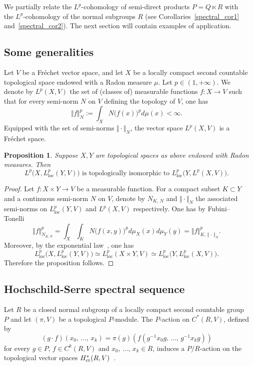 \documentclass[11pt]{article}
\newtheorem{prop}[theo]{Proposition}
\theoremstyle{definition}
\numberwithin{equation}{section}
\numberwithin{figure}{section}
\numberwithin{table}{section}
\DeclareMathOperator{\ct}{ct}
\DeclareMathOperator{\loc}{loc}
\begin{document}
We partially relate the $L^p$-cohomology of semi-direct products $P = Q \ltimes R$ with the $L^p$-cohomology of the normal subgroups $R$ (see Corollaries~\ref{spectral_cor1} and~\ref{spectral_cor2}). The next section will contain examples of application.

\subsection*{Some generalities}

Let $V$ be a Fréchet vector space, and let $X$ be a locally compact second countable topological space endowed with a Radon measure $\mu$. Let $p \in (1, +\infty)$. We denote by $L^p(X, V)$ the set of (classes of) measurable functions $f: X \to V$ such that for every semi-norm $N$ on $V$ defining the topology of $V$, one has
\[
\Vert f \Vert _N ^p:= \int _X N\bigl(f(x)\bigr) ^p d\mu (x) < \infty.
\]
Equipped with the set of semi-norms $\Vert \cdot \Vert _N$, the vector space $L^p(X,V)$ is a Fréchet space.



\begin{prop}\label{generalities_prop2}
Suppose $X, Y$ are topological spaces as above endowed with Radon measures. Then
\[
L^p\bigl(X, L_{\loc}^p (Y, V)\bigr) \text{ is topologically isomorphic to }L_{\loc}^p \bigl(Y, L^p (X,V)\bigr).
\]
\end{prop}

\begin{proof}
Let $f: X \times Y \to V$ be a measurable function.
For a compact subset $K \subset Y$ and a continuous semi-norm $N$ on $V$, denote by $N_{K,\,N}$ and $\Vert \cdot \Vert _N$ the associated semi-norms on $L_{\loc}^p (Y, V)$ and $L^p (X,V)$ respectively. One has by Fubini--Tonelli
\[
\Vert f \Vert _{N_{K, N}} ^p
= \int _X \int _K N\bigl(f(x,y)\bigr) ^p d\mu_X (x) d\mu _Y (y)= \Vert f \Vert _{K,\, \Vert\,\cdot\,\Vert _N} ^p.
\]
Moreover, by the exponential law~\cite[Lemma~1.4]{Bl}, one has
\[
L_{\loc} ^p \bigl(X, L_{\loc} ^p(Y, V)\bigr) \simeq L_{\loc} ^p (X \times Y, V) \simeq
L_{\loc} ^p \bigl(Y, L_{\loc} ^p(X, V)\bigr).
\]
Therefore the proposition follows.
\end{proof}


\subsection*{Hochschild-Serre spectral sequence}

Let $R$ be a closed normal subgroup of a locally compact second countable group $P$ and let $(\pi, V)$ be a topological $P$-module. The $P$-action on $C^*(R,V)$, defined by
\[
(g \cdot f) (x_0,\,\dots,\,x_k) = \pi (g)\left(f\left(g^{-1} x_0 g,\,\dots,\,g^{-1} x_k g\right)\right)
\]
for every $g \in P$, $f \in C^k (R,V)$ and $x_0,\,\dots,\,x_k \in R$, induces a $P/R$-action on the topological vector spaces ${\rm H}_{\ct} ^*(R, V)$~\cite[p.~50]{Gui}.
\end{document}
